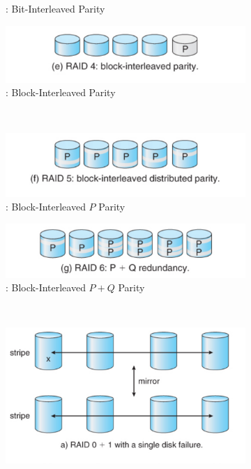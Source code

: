 \begin{figure}[h!tbp]
\begin{subfigure}{0.45\linewidth}
    \caption{: Bit-Interleaved Parity}
    \label{subfig:RAID_3}
  \end{subfigure}
  \begin{subfigure}{0.45\linewidth}
    \centering
    \includegraphics[scale=1.00]{./Drawings/EDAF35-Operating_Systems/RAID_4.png}
    \caption{: Block-Interleaved Parity}
    \label{subfig:RAID_4}
  \end{subfigure} \\
  \begin{subfigure}{0.45\linewidth}
    \centering
    \includegraphics[scale=1.00]{./Drawings/EDAF35-Operating_Systems/RAID_5.png}
    \caption{: Block-Interleaved $P$ Parity}
    \label{subfig:RAID_5}
  \end{subfigure}
  \begin{subfigure}{0.45\linewidth}
    \centering
    \includegraphics[scale=1.00]{./Drawings/EDAF35-Operating_Systems/RAID_6.png}
    \caption{: Block-Interleaved $P+Q$ Parity}
    \label{subfig:RAID_6}
  \end{subfigure} \\
  \begin{subfigure}{0.45\linewidth}
    \centering
    \includegraphics[scale=1.00]{./Drawings/EDAF35-Operating_Systems/RAID_01.png}

\end{subfigure}
\end{figure}
